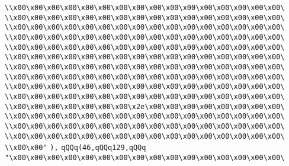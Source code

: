 \verb|\\x00\x00\x00\x00\x00\x00\x00\x00\x00\x00\x00\x00\x00\x00\x00\x00\|\newline
\verb|\\x00\x00\x00\x00\x00\x00\x00\x00\x00\x00\x00\x00\x00\x00\x00\x00\|\newline
\verb|\\x00\x00\x00\x00\x00\x00\x00\x00\x00\x00\x00\x00\x00\x00\x00\x00\|\newline
\verb|\\x00\x00\x00\x00\x00\x00\x00\x00\x00\x00\x00\x00\x00\x00\x00\x00\|\newline
\verb|\\x00\x00\x00\x00\x00\x00\x00\x00\x00\x00\x00\x00\x00\x00\x00\x00\|\newline
\verb|\\x00\x00\x00\x00\x00\x00\x00\x00\x00\x00\x00\x00\x00\x00\x00\x00\|\newline
\verb|\\x00\x00\x00\x00\x00\x00\x00\x00\x00\x00\x00\x00\x00\x00\x00\x00\|\newline
\verb|\\x00\x00\x00\x00\x00\x00\x00\x00\x00\x00\x00\x00\x00\x00\x00\x00\|\newline
\verb|\\x00\x00\x00\x00\x00\x00\x00\x00\x00\x00\x00\x00\x00\x00\x00\x00\|\newline
\verb|\\x00\x00\x00\x00\x00\x00\x00\x00\x00\x00\x00\x00\x00\x00\x00\x00\|\newline
\verb|\\x00\x00\x00\x00\x00\x00\x00\x2e\x00\x00\x00\x00\x00\x00\x00\x00\|\newline
\verb|\\x00\x00\x00\x00\x00\x00\x00\x00\x00\x00\x00\x00\x00\x00\x00\x00\|\newline
\verb|\\x00\x00\x00\x00\x00\x00\x00\x00\x00\x00\x00\x00\x00\x00\x00\x00\|\newline
\verb|\\x00\x00\x00\x00\x00\x00\x00\x00\x00\x00\x00\x00\x00\x00\x00\x00\|\newline
\verb|\\x00\x00"|\newline
\verb|),|\newline
\verb|qQQq(46,qQQq129,qQQq|\newline
\verb|"\x00\x00\x00\x00\x00\x00\x00\x00\x00\x00\x00\x00\x00\x00\x00\x00\|\newline
